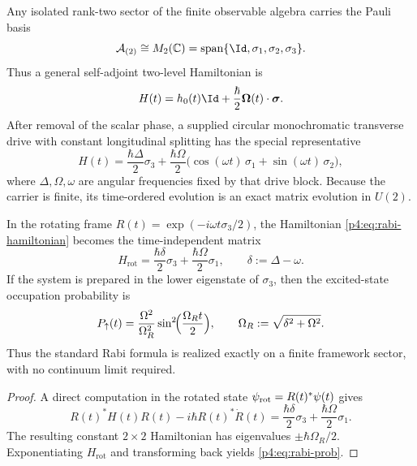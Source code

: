 \documentclass[12pt,a4paper]{article}
\begin{document}
Any isolated rank-two sector of the finite observable algebra carries the Pauli basis
\begin{equation}
\label{p4:eq:pauli-sector}
\mathcal A_{(2)}\cong M_2(\mathbb C)=\mathrm{span}\{\Id,\sigma_1,\sigma_2,\sigma_3\}.
\end{equation}
Thus a general self-adjoint two-level Hamiltonian is
\[
H(t)=h_0(t)\Id+\frac{\hbar}{2}\boldsymbol\Omega(t)\cdot\boldsymbol\sigma.
\]
After removal of the scalar phase, a supplied circular monochromatic transverse
drive with constant longitudinal splitting has the special representative
\begin{equation}
\label{p4:eq:rabi-hamiltonian}
H(t)=\frac{\hbar\Delta}{2}\sigma_3
+ \frac{\hbar\Omega}{2}\bigl(\cos(\omega t)\,\sigma_1+\sin(\omega t)\,\sigma_2\bigr),
\end{equation}
where \(\Delta,\Omega,\omega\) are angular frequencies fixed by that drive
block.  Because the carrier is finite, its time-ordered evolution is an exact
matrix evolution in \(U(2)\).

\begin{proposition}
\label{p4:prop:rabi}
In the rotating frame $R(t)=\exp(-i\omega t\sigma_3/2)$, the Hamiltonian \eqref{p4:eq:rabi-hamiltonian} becomes the time-independent matrix
\begin{equation}
\label{p4:eq:rabi-effective}
H_{\mathrm{rot}}=\frac{\hbar\delta}{2}\sigma_3+\frac{\hbar\Omega}{2}\sigma_1,
\qquad
\delta:=\Delta-\omega.
\end{equation}
If the system is prepared in the lower eigenstate of $\sigma_3$, then the excited-state occupation probability is
\begin{equation}
\label{p4:eq:rabi-prob}
P_{\uparrow}(t)=\frac{\Omega^2}{\Omega_R^2}\sin^2\!\Bigl(\frac{\Omega_R t}{2}\Bigr),
\qquad
\Omega_R:=\sqrt{\delta^2+\Omega^2}.
\end{equation}
Thus the standard Rabi formula is realized exactly on a finite framework sector, with no continuum limit required.
\end{proposition}

\begin{proof}
A direct computation in the rotated state
\(\psi_{\rm rot}=R(t)^*\psi(t)\) gives
\[
R(t)^*H(t)R(t)-i\hbar R(t)^*\dot R(t)
=\frac{\hbar\delta}{2}\sigma_3+\frac{\hbar\Omega}{2}\sigma_1.
\]
The resulting constant \(2\times2\) Hamiltonian has eigenvalues
\(\pm\hbar\Omega_R/2\).
Exponentiating $H_{\mathrm{rot}}$ and transforming back yields \eqref{p4:eq:rabi-prob}.
\end{proof}
\end{document}
